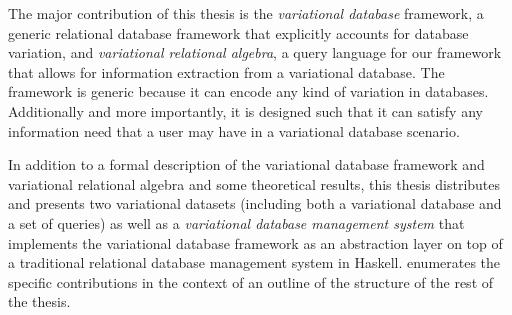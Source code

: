 The major contribution of this thesis is the \emph{variational database} framework,
a generic relational database framework that explicitly accounts for database variation,
and \emph{variational relational algebra}, a query language for our framework
that allows for information extraction from a variational database. 
The framework is generic because it can encode any kind of variation
in databases. Additionally and more importantly, it is designed such that it can satisfy
any information need that a user may have in a variational database scenario. 

In addition to a formal description of the variational database framework and
variational relational algebra and some theoretical results,
this thesis distributes and presents two variational datasets (including both a variational
database and a set of queries) as well as a \emph{variational database management system}
that implements the variational database framework as an abstraction layer on top of a 
traditional relational database management system in Haskell.
 enumerates the specific contributions in the context of an outline
of the structure of the rest of the thesis. 





%


